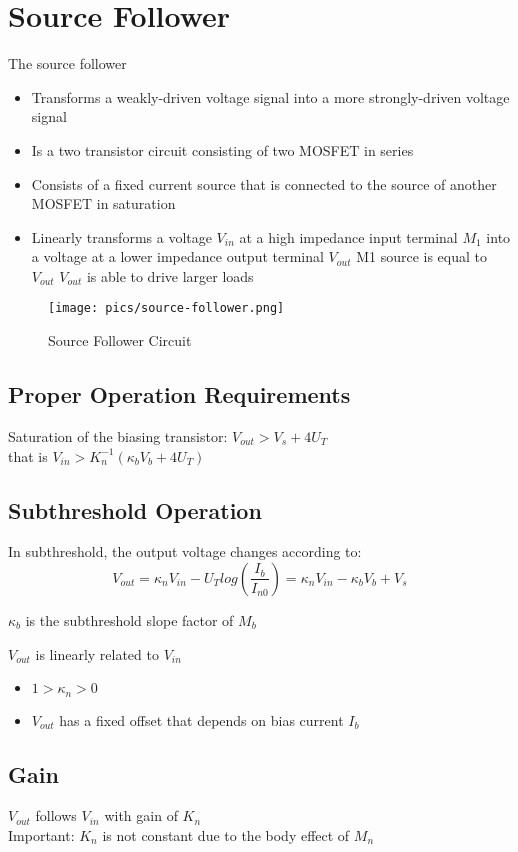 \documentclass[main]{subfiles}
\begin{document}
\section{Source Follower}
The source follower
\begin{itemize}
\item Transforms a weakly-driven voltage signal into a more strongly-driven voltage signal
\item Is a two transistor circuit consisting of two MOSFET in series
\item Consists of a fixed current source that is connected to the source of another MOSFET in saturation 
\item Linearly transforms a voltage $V_{in}$ at a high impedance input terminal $M_1$ into a voltage at a lower impedance output terminal $V_{out}$
\subitem M1 source is equal to $V_{out}$
\subitem $V_{out}$ is able to drive larger loads
\end{itemize}

\begin{figure}[htbp]
  \centering
  \texttt{[image: pics/source-follower.png]}
  \caption{Source Follower Circuit \cite{book:VLSI}}
  \label{fig:Source_Follower_Structure}
\end{figure}

\subsection{Proper Operation Requirements}
Saturation of the biasing transistor: $V_{out} > V_s + 4U_T$\\
that is $V_{in} > K_{n}^{-1}(\kappa_b V_b + 4U_T)$

\subsection{Subthreshold Operation}
In subthreshold, the output voltage changes according to:
\begin{equation}
V_{out}=\kappa_n V_{in} - U_T log(\frac{I_b}{I_{n0}}) = \kappa_n V_{in} - \kappa_b V_b + V_s
\end{equation}
\begin{center}
$\kappa_b$ is the subthreshold slope factor of $M_b$\\
\end{center}
$V_{out}$ is linearly related to $V_{in}$
\begin{itemize}[label={}]
\item $1 >\kappa_n >0$
\item $V_{out}$ has a fixed offset that depends on bias current $I_b$
\end{itemize}

\subsection{Gain}
$V_{out}$ follows $V_{in}$ with gain of $K_n$\\
Important: $K_n$ is not constant due to the body effect of $M_n$

\end{document}
